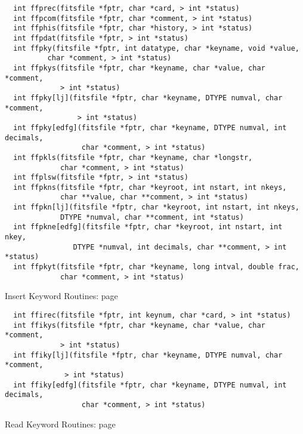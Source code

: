 \begin{verbatim}
  int ffprec(fitsfile *fptr, char *card, > int *status)
  int ffpcom(fitsfile *fptr, char *comment, > int *status)
  int ffphis(fitsfile *fptr, char *history, > int *status)
  int ffpdat(fitsfile *fptr, > int *status)
  int ffpky(fitsfile *fptr, int datatype, char *keyname, void *value,
          char *comment, > int *status)
  int ffpkys(fitsfile *fptr, char *keyname, char *value, char *comment,
             > int *status)
  int ffpky[lj](fitsfile *fptr, char *keyname, DTYPE numval, char *comment,
                 > int *status)
  int ffpky[edfg](fitsfile *fptr, char *keyname, DTYPE numval, int decimals,
                  char *comment, > int *status)
  int ffpkls(fitsfile *fptr, char *keyname, char *longstr,
             char *comment, > int *status)
  int ffplsw(fitsfile *fptr, > int *status)
  int ffpkns(fitsfile *fptr, char *keyroot, int nstart, int nkeys,
             char **value, char **comment, > int *status)
  int ffpkn[lj](fitsfile *fptr, char *keyroot, int nstart, int nkeys,
             DTYPE *numval, char **comment, int *status)
  int ffpkne[edfg](fitsfile *fptr, char *keyroot, int nstart, int nkey,
                DTYPE *numval, int decimals, char **comment, > int *status)
  int ffpkyt(fitsfile *fptr, char *keyname, long intval, double frac,
             char *comment, > int *status)
\end{verbatim}
 Insert Keyword Routines: page~\pageref{FFIREC}

\begin{verbatim}
  int ffirec(fitsfile *fptr, int keynum, char *card, > int *status)
  int ffikys(fitsfile *fptr, char *keyname, char *value, char *comment,
             > int *status)
  int ffiky[lj](fitsfile *fptr, char *keyname, DTYPE numval, char *comment,
              > int *status)
  int ffiky[edfg](fitsfile *fptr, char *keyname, DTYPE numval, int decimals,
                  char *comment, > int *status)
\end{verbatim}
 Read Keyword Routines: page~\pageref{FFGREC}

